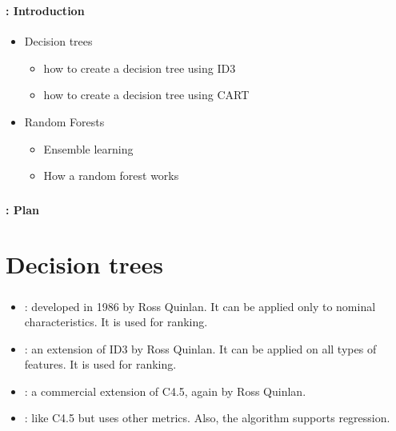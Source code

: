 \documentclass[xcolor=table]{beamer}
\subtitle[DT \& Ensemble]{Decision trees and Ensemble learning}
\begin{document}
	
\begin{frame}
	\frametitle{\inserttitle}
	\framesubtitle{\insertshortsubtitle: Introduction}
	
	\begin{itemize}
		\item Decision trees
		\begin{itemize}
			\item how to create a decision tree using ID3
			\item how to create a decision tree using CART
		\end{itemize}
		\item Random Forests
		\begin{itemize}
			\item Ensemble learning
			\item How a random forest works
		\end{itemize}
	\end{itemize}

\end{frame}


\begin{frame}
	\frametitle{\inserttitle}
	\framesubtitle{\insertshortsubtitle: Plan}
	
	\begin{multicols}{2}
		\tableofcontents
	\end{multicols}
\end{frame}

\section{Decision trees}

\begin{frame}
	\frametitle{\insertsection}
	
	\begin{itemize}
		\item {}: developed in 1986 by Ross Quinlan. It can be applied only to nominal characteristics. It is used for ranking.
		\item {}: an extension of ID3 by Ross Quinlan. It can be applied on all types of features. It is used for ranking.
		\item {}: a commercial extension of C4.5, again by Ross Quinlan.
		\item {}: like C4.5 but uses other metrics. Also, the algorithm supports regression.
	\end{itemize}
	
\end{frame}
\end{document}
